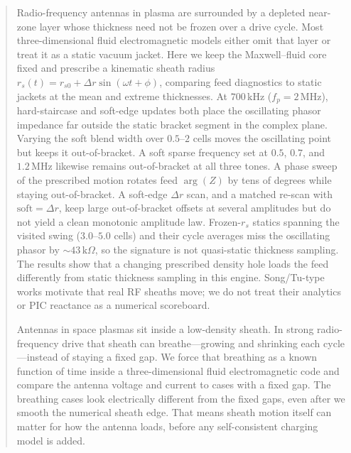 \documentclass[draft]{agujournal2025}
\begin{document}
\begin{abstract}
Radio-frequency antennas in plasma are surrounded by a depleted near-zone layer whose thickness need not be frozen over a drive cycle.
Most three-dimensional fluid electromagnetic models either omit that layer or treat it as a static vacuum jacket.
Here we keep the Maxwell--fluid core fixed and prescribe a kinematic sheath radius \(r_s(t)=r_{s0}+\Delta r\sin(\omega t+\phi)\), comparing feed diagnostics to static jackets at the mean and extreme thicknesses.
At \(700\,\mathrm{kHz}\) (\(f_p=2\,\mathrm{MHz}\)), hard-staircase and soft-edge updates both place the oscillating phasor impedance far outside the static bracket segment in the complex plane.
Varying the soft blend width over \(0.5\)--\(2\) cells moves the oscillating point but keeps it out-of-bracket.
A soft sparse frequency set at \(0.5\), \(0.7\), and \(1.2\,\mathrm{MHz}\) likewise remains out-of-bracket at all three tones.
A phase sweep of the prescribed motion rotates feed \(\arg(Z)\) by tens of degrees while staying out-of-bracket.
A soft-edge \(\Delta r\) scan, and a matched re-scan with \(\mathrm{soft}=\Delta r\), keep large out-of-bracket offsets at several amplitudes but do not yield a clean monotonic amplitude law.
Frozen-$r_s$ statics spanning the visited swing ($3.0$--$5.0$ cells) and their cycle averages miss the oscillating phasor by $\sim 43\,\mathrm{k}\Omega$, so the signature is not quasi-static thickness sampling.
The results show that a changing prescribed density hole loads the feed differently from static thickness sampling in this engine.
Song/Tu-type works motivate that real RF sheaths move; we do not treat their analytics or PIC reactance as a numerical scoreboard.
\begin{plainlanguagesummary}
Antennas in space plasmas sit inside a low-density sheath.
In strong radio-frequency drive that sheath can breathe---growing and shrinking each cycle---instead of staying a fixed gap.
We force that breathing as a known function of time inside a three-dimensional fluid electromagnetic code and compare the antenna voltage and current to cases with a fixed gap.
The breathing cases look electrically different from the fixed gaps, even after we smooth the numerical sheath edge.
That means sheath motion itself can matter for how the antenna loads, before any self-consistent charging model is added.
\end{plainlanguagesummary}
\end{abstract}

\maketitle
\end{document}
